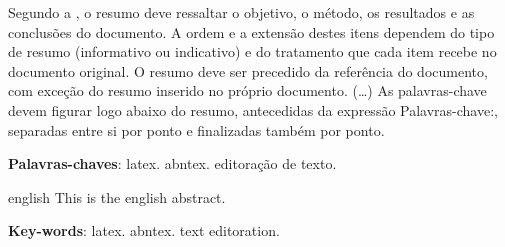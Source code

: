 \documentclass[12pt,oneside,a4paper,english,french,spanish,brazil,]{abntex2}
\begin{document}
\frenchspacing 


\imprimircapa
\imprimirfolhaderosto





\begin{resumo}
 Segundo a \citet[3.1-3.2]{NBR6028:2003}, o resumo deve ressaltar o
 objetivo, o método, os resultados e as conclusões do documento. A ordem e a extensão
 destes itens dependem do tipo de resumo (informativo ou indicativo) e do
 tratamento que cada item recebe no documento original. O resumo deve ser
 precedido da referência do documento, com exceção do resumo inserido no
 próprio documento. (\ldots) As palavras-chave devem figurar logo abaixo do
 resumo, antecedidas da expressão Palavras-chave:, separadas entre si por
 ponto e finalizadas também por ponto.

 \vspace{\onelineskip}
    
 \noindent
 \textbf{Palavras-chaves}: latex. abntex. editoração de texto.
\end{resumo}

\begin{resumo}[Abstract]
 \begin{otherlanguage*}{english}
   This is the english abstract.

   \vspace{\onelineskip}
 
   \noindent 
   \textbf{Key-words}: latex. abntex. text editoration.
 \end{otherlanguage*}
\end{resumo}


\listoffigures*
\cleardoublepage

\listoftables*
\cleardoublepage
\end{document}
